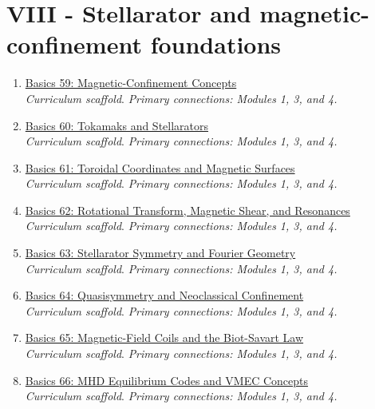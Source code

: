 \documentclass[11pt]{article}
\begin{document}
\section{VIII - Stellarator and magnetic-confinement foundations}
\begin{enumerate}[leftmargin=2.4em]
\item[\textbf{59.}] \href{run:basics_59_magnetic_confinement_concepts.pdf}{Basics 59: Magnetic-Confinement Concepts}\\[-0.2em]
\textit{Curriculum scaffold}. \textit{Primary connections: Modules 1, 3, and 4.}
\item[\textbf{60.}] \href{run:basics_60_tokamaks_and_stellarators.pdf}{Basics 60: Tokamaks and Stellarators}\\[-0.2em]
\textit{Curriculum scaffold}. \textit{Primary connections: Modules 1, 3, and 4.}
\item[\textbf{61.}] \href{run:basics_61_toroidal_coordinates_and_magnetic_surfaces.pdf}{Basics 61: Toroidal Coordinates and Magnetic Surfaces}\\[-0.2em]
\textit{Curriculum scaffold}. \textit{Primary connections: Modules 1, 3, and 4.}
\item[\textbf{62.}] \href{run:basics_62_rotational_transform_magnetic_shear_and_resonances.pdf}{Basics 62: Rotational Transform, Magnetic Shear, and Resonances}\\[-0.2em]
\textit{Curriculum scaffold}. \textit{Primary connections: Modules 1, 3, and 4.}
\item[\textbf{63.}] \href{run:basics_63_stellarator_symmetry_and_fourier_geometry.pdf}{Basics 63: Stellarator Symmetry and Fourier Geometry}\\[-0.2em]
\textit{Curriculum scaffold}. \textit{Primary connections: Modules 1, 3, and 4.}
\item[\textbf{64.}] \href{run:basics_64_quasisymmetry_and_neoclassical_confinement.pdf}{Basics 64: Quasisymmetry and Neoclassical Confinement}\\[-0.2em]
\textit{Curriculum scaffold}. \textit{Primary connections: Modules 1, 3, and 4.}
\item[\textbf{65.}] \href{run:basics_65_magnetic_field_coils_and_biot_savart_law.pdf}{Basics 65: Magnetic-Field Coils and the Biot-Savart Law}\\[-0.2em]
\textit{Curriculum scaffold}. \textit{Primary connections: Modules 1, 3, and 4.}
\item[\textbf{66.}] \href{run:basics_66_mhd_equilibrium_codes_and_vmec_concepts.pdf}{Basics 66: MHD Equilibrium Codes and VMEC Concepts}\\[-0.2em]
\textit{Curriculum scaffold}. \textit{Primary connections: Modules 1, 3, and 4.}
\end{enumerate}
\end{document}

